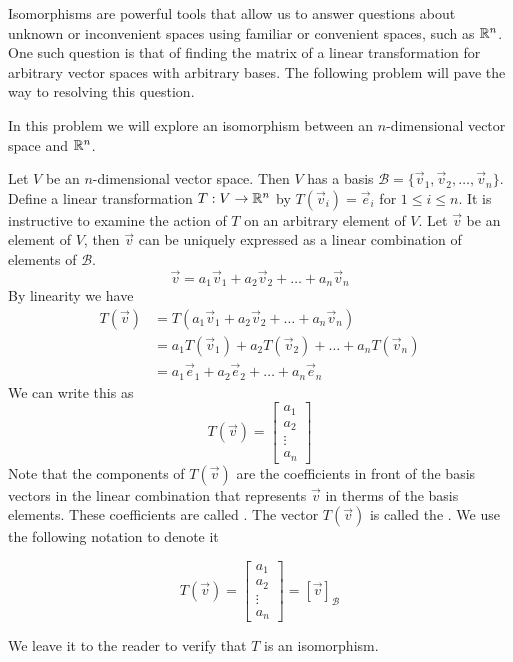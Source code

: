 \documentclass{ximera}
\begin{document}
Isomorphisms are powerful tools that allow us to answer questions about unknown or inconvenient spaces using familiar or convenient spaces, such as $\mathbb{R}^n$.  One such question is that of finding the matrix of a linear transformation for arbitrary vector spaces with arbitrary bases.  The following problem will pave the way to resolving this question. 


\begin{initprob}\label{init:coordmapping} In this problem we will explore an isomorphism between an $n$-dimensional vector space and $\mathbb{R}^n$.

Let $V$ be an $n$-dimensional vector space.  Then $V$ has a basis $\mathcal{B}=\{\vec{v}_1, \vec{v}_2,\ldots ,\vec{v}_n\}$.  Define a linear transformation $T:V\rightarrow \mathbb{R}^n$ by $T(\vec{v}_i)=\vec{e}_i$ for $1\leq i\leq n$.
It is instructive to examine the action of $T$ on an arbitrary element of $V$.  Let $\vec{v}$ be an element of $V$, then $\vec{v}$ can be uniquely expressed as a linear combination of elements of $\mathcal{B}$.
$$\vec{v}=a_1\vec{v}_1+a_2\vec{v}_2+\ldots +a_n\vec{v}_n$$
By linearity we have
\begin{align*}
T(\vec{v})&=T(a_1\vec{v}_1+a_2\vec{v}_2+\ldots +a_n\vec{v}_n)\\
&=a_1T(\vec{v}_1)+a_2T(\vec{v}_2)+\ldots +a_nT(\vec{v}_n)\\
&=a_1\vec{e}_1+a_2\vec{e}_2+\ldots +a_n\vec{e}_n
\end{align*}
We can write this as $$T(\vec{v})=\begin{bmatrix}a_1\\a_2\\\vdots\\a_n\end{bmatrix}$$
Note that the components of $T(\vec{v})$ are the coefficients in front of the basis vectors in the linear combination that represents $\vec{v}$ in therms of the basis elements.  These coefficients are called .  The vector $T(\vec{v})$  is called the . We use the following notation to denote it

$$T(\vec{v})=\begin{bmatrix}a_1\\a_2\\\vdots\\a_n\end{bmatrix}=[\vec{v}]_{\mathcal{B}}$$

We leave it to the reader to verify that $T$ is an isomorphism.

\end{initprob}
\end{document}
